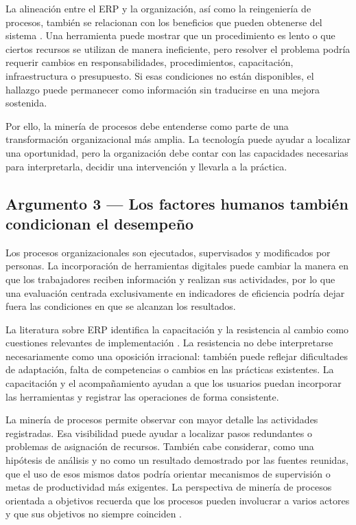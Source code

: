 \documentclass{article}
\begin{document}
    La alineación entre el ERP y la organización, así como la reingeniería de procesos, también se relacionan con los beneficios que pueden obtenerse del sistema \cite{erpimpact2024}. Una herramienta puede mostrar que un procedimiento es lento o que ciertos recursos se utilizan de manera ineficiente, pero resolver el problema podría requerir cambios en responsabilidades, procedimientos, capacitación, infraestructura o presupuesto. Si esas condiciones no están disponibles, el hallazgo puede permanecer como información sin traducirse en una mejora sostenida.

    Por ello, la minería de procesos debe entenderse como parte de una transformación organizacional más amplia. La tecnología puede ayudar a localizar una oportunidad, pero la organización debe contar con las capacidades necesarias para interpretarla, decidir una intervención y llevarla a la práctica.

    \subsection{Argumento 3 — Los factores humanos también condicionan el desempeño}

    Los procesos organizacionales son ejecutados, supervisados y modificados por personas. La incorporación de herramientas digitales puede cambiar la manera en que los trabajadores reciben información y realizan sus actividades, por lo que una evaluación centrada exclusivamente en indicadores de eficiencia podría dejar fuera las condiciones en que se alcanzan los resultados.

    La literatura sobre ERP identifica la capacitación y la resistencia al cambio como cuestiones relevantes de implementación \cite{talo2025erp}. La resistencia no debe interpretarse necesariamente como una oposición irracional: también puede reflejar dificultades de adaptación, falta de competencias o cambios en las prácticas existentes. La capacitación y el acompañamiento ayudan a que los usuarios puedan incorporar las herramientas y registrar las operaciones de forma consistente.

    La minería de procesos permite observar con mayor detalle las actividades registradas. Esa visibilidad puede ayudar a localizar pasos redundantes o problemas de asignación de recursos. También cabe considerar, como una hipótesis de análisis y no como un resultado demostrado por las fuentes reunidas, que el uso de esos mismos datos podría orientar mecanismos de supervisión o metas de productividad más exigentes. La perspectiva de minería de procesos orientada a objetivos recuerda que los procesos pueden involucrar a varios actores y que sus objetivos no siempre coinciden \cite{ghasemi2020eventlogs}.
\end{document}
